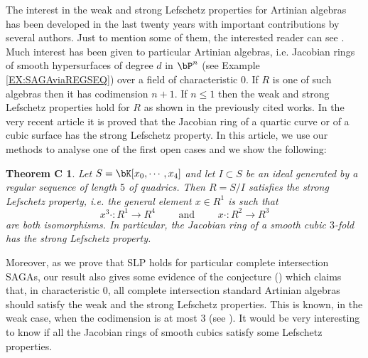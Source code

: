 \documentclass[a4paper,11pt]{amsart}
\newtheorem*{thC}{Theorem C}
\begin{document}
The interest in the weak and strong Lefschetz properties for Artinian algebras has been developed in the last twenty years with important contributions by several authors. 
Just to mention some of them, the interested reader can see \cite{HMNW03,BK07,MN13,GZ18, Ila18, DGI20}. Much interest has been given to particular Artinian algebras, i.e. Jacobian rings of smooth hypersurfaces of degree $d$ in $\bP^n$ (see Example \ref{EX:SAGAviaREGSEQ}) over a field of characteristic $0$. 
If $R$ is one of such algebras then it has codimension $n+1$. If $n\leq 1$ then the weak and strong Lefschetz properties hold for $R$ as shown in the previously cited works. In the very recent article \cite{DGI20} it is proved that the Jacobian ring of a quartic curve or of a cubic surface has the strong Lefschetz property. In this article, we use our methods to analyse one of the first open cases and we show the following:
\begin{thC}
Let $S=\bK[x_0,\cdots,x_4]$ and let $I\subset S$ be an ideal generated by a regular sequence of length $5$ of quadrics. Then $R=S/I$ satisfies the strong Lefschetz property, i.e. the general element $x\in R^1$ is such that
$$x^3\cdot :R^1\to R^4 \qquad\mbox{ and }\qquad x\cdot :R^2\to R^3$$
are both isomorphisms. In particular, the Jacobian ring of a smooth cubic $3$-fold has the strong Lefschetz property.
\end{thC}

Moreover, as we prove that SLP holds for particular complete intersection SAGAs, our result also gives some evidence of the conjecture (\cite[Conjecture 3.46 pag. 120]{bookLef}) which claims that, in characteristic $0$, all complete intersection standard Artinian algebras should satisfy the weak and the strong Lefschetz properties. This is known, in the weak case, when the codimension is at most $3$ (see \cite{HMNW03}). It would be very interesting to know if all the Jacobian rings of smooth cubics satisfy some Lefschetz properties.
\vspace{2mm}
\end{document}
